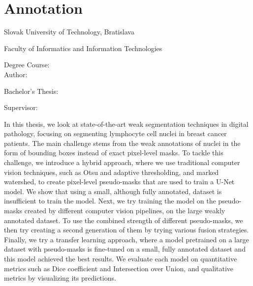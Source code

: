 
\thispagestyle{empty}

\section*{Annotation}

\begin{minipage}[t]{1\columnwidth}%
Slovak University of Technology, Bratislava 

Faculty of Informatics and Information Technologies

Degree Course: \myStudyProgram\\

Author: \myName

Bachelor's Thesis: \myTitle

Supervisor: \mySupervisor

\myDate%
\end{minipage}

\bigskip{}


In this thesis, we look at state-of-the-art weak segmentation techniques in digital pathology, focusing on segmenting lymphocyte cell nuclei in breast cancer patients. The main challenge stems from the weak annotations of nuclei in the form of bounding boxes instead of exact pixel-level masks. To tackle this challenge, we introduce a hybrid approach, where we use traditional computer vision techniques, such as Otsu and adaptive thresholding, and marked watershed, to create pixel-level pseudo-masks that are used to train a U-Net model. 
We show that using a small, although fully annotated, dataset is insufficient to train the model. Next, we try training the model on the pseudo-masks created by different computer vision pipelines, on the large weakly annotated dataset. To use the combined strength of different pseudo-masks, we then try creating a second generation of them by trying various fusion strategies. Finally, we try a transfer learning approach, where a model pretrained on a large dataset with pseudo-masks is fine-tuned on a small, fully annotated dataset and this model achieved the best results. We evaluate each model on quantitative metrics such as Dice coefficient and Intersection over Union, and qualitative metrics by visualizing its predictions.

